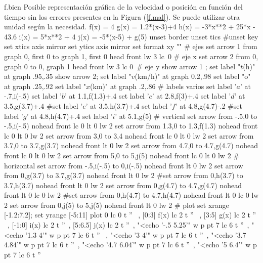 \begin{plot}{.9}{f.bien}
  {Posible representación gráfica de la velocidad o posición en función del
  tiempo sin los errores presentes en la Figura (\ref{f.mal}). Se puede utilizar
  otra unidad según la necesidad.}
  f(x) = 4
  g(x) = 1.2*(x-3)+4
  h(x) = -3*x**2 + 25*x - 43.6
  i(x) = 5*x**2 + 4
  j(x) = -5*(x-5) + g(5)
  unset border
  unset tics
  #unset key
  set xtics axis mirror
  set ytics axis mirror
  set format xy ""
  # ejes
  set arrow 1 from graph 0, first 0 to graph 1, first 0 head front lw 3 lc\
  0 # eje x
  set arrow 2 from 0, graph 0 to 0, graph 1 head front lw 3 lc 0\
  # eje y 
  show arrow 1 ; set label "$t$(h)" at graph .95,.35
  show arrow 2; set label "$v$(km/h)" at graph 0.2,.98 
  set label "o" at graph .25,.92
  set label "$x$(km)" at graph .2,.86
  # labels varios
  set label '$a$' at -.7,i(-.5) 
  set label '$b$' at 1.1,f(1.3)+.4
  set label '$c$' at 2.8,f(3)+.4
  set label '$d$' at 3.5,g(3.7)+.4
  #set label '$e$' at 3.5,h(3.7)+.4
  set label '$f$' at 4.8,g(4.7)-.2 
  #set label '$g$' at 4.8,h(4.7)+.4 
  set label '$i$' at 5.1,g(5)
  # vertical
  set arrow from -.5,0 to -.5,i(-.5) nohead front lc 0 lt 0 lw 2 
  set arrow from 1.3,0 to 1.3,f(1.3) nohead front lc 0 lt 0 lw 2 
  set arrow from 3,0 to 3,4 nohead front lc 0 lt 0 lw 2
  set arrow from 3.7,0 to 3.7,g(3.7) nohead front  lt 0 lw 2 
  set arrow from 4.7,0 to 4.7,g(4.7) nohead front lc 0 lt 0 lw 2 
  set arrow from 5,0 to 5,j(5) nohead front lc 0 lt 0 lw 2
  # horizontal
  set arrow from -.5,i(-.5) to 0,i(-.5) nohead front lt 0 lw 2
  set arrow from 0,g(3.7) to 3.7,g(3.7) nohead front lt 0 lw 2
  #set arrow from 0,h(3.7) to 3.7,h(3.7) nohead front lt 0 lw 2
  set arrow from 0,g(4.7) to 4.7,g(4.7) nohead front lt 0 lc 0 lw 2
  #set arrow from 0,h(4.7) to 4.7,h(4.7) nohead front lt 0 lc 0 lw 2
  set arrow from 0,j(5) to 5,j(5) nohead front lt 0 lw 2
  # plot
  set xrange [-1.2:7.2]; set yrange [-5:11]
  plot 0 lc 0 t '' \
  , [0:3] f(x) lc 2 t '' \
  , [3:5] g(x) lc 2 t '' \
  , [-1:0] i(x) lc 2 t ''\
  , [5:6.5] j(x) lc 2 t ''\
  , "<echo '-.5 5.25'" w p pt 7 lc 6 t ''\
  , "<echo '1.3 4'" w p pt 7 lc 6 t '' \
  , "<echo '3 4'" w p pt 7 lc 6 t ''\
  , "<echo '3.7 4.84'" w p pt 7 lc 6 t ''\
  , "<echo '4.7 6.04'" w p pt 7 lc 6 t ''\
  , "<echo '5 6.4'" w p pt 7 lc 6 t ''\
\end{plot}

